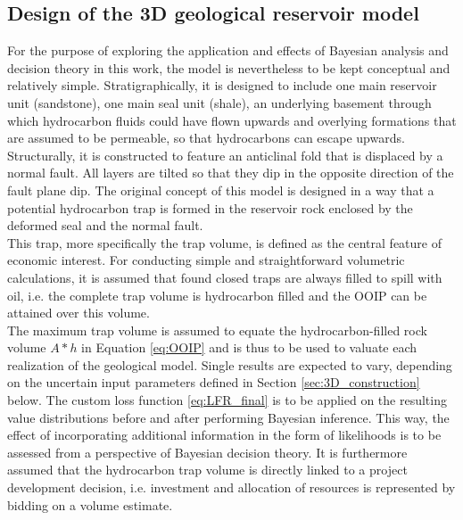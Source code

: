 		\subsection{Design of the 3D geological reservoir model}\label{sec:3D_design}
		For the purpose of exploring the application and effects of Bayesian analysis and decision theory in this work, the model is nevertheless to be kept conceptual and relatively simple. Stratigraphically, it is designed to include one main reservoir unit (sandstone), one main seal unit (shale), an underlying basement through which hydrocarbon fluids could have flown upwards and overlying formations that are assumed to be permeable, so that hydrocarbons can escape upwards. Structurally, it is constructed to feature an anticlinal fold that is displaced by a normal fault. All layers are tilted so that they dip in the opposite direction of the fault plane dip. The original concept of this model is designed in a way that a potential hydrocarbon trap is formed in the reservoir rock enclosed by the deformed seal and the normal fault.\\
		This trap, more specifically the trap volume, is defined as the central feature of economic interest. For conducting simple and straightforward volumetric calculations, it is assumed that found closed traps are always filled to spill with oil, i.e. the complete trap volume is hydrocarbon filled and the OOIP can be attained over this volume.\\
		The maximum trap volume is assumed to equate the hydrocarbon-filled rock volume $A * h$ in Equation \ref{eq:OOIP} and is thus to be used to valuate each realization of the geological model. Single results are expected to vary, depending on the uncertain input parameters defined in Section \ref{sec:3D_construction} below. The custom loss function \ref{eq:LFR_final} is to be applied on the resulting value distributions before and after performing Bayesian inference. This way, the effect of incorporating additional information in the form of likelihoods is to be assessed from a perspective of Bayesian decision theory. It is furthermore assumed that the hydrocarbon trap volume is directly linked to a project development decision, i.e. investment and allocation of resources is represented by bidding on a volume estimate.
		
